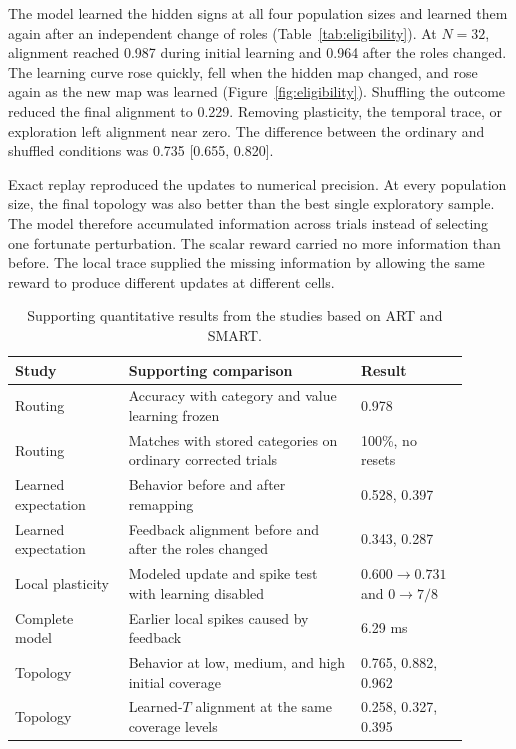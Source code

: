 \documentclass[11pt]{article}
\begin{document}
The model learned the hidden signs at all four population sizes and learned them again after an independent change of roles (Table~\ref{tab:eligibility}). At $N=32$, alignment reached 0.987 during initial learning and 0.964 after the roles changed. The learning curve rose quickly, fell when the hidden map changed, and rose again as the new map was learned (Figure~\ref{fig:eligibility}). Shuffling the outcome reduced the final alignment to 0.229. Removing plasticity, the temporal trace, or exploration left alignment near zero. The difference between the ordinary and shuffled conditions was 0.735 [0.655, 0.820].

Exact replay reproduced the updates to numerical precision. At every population size, the final topology was also better than the best single exploratory sample. The model therefore accumulated information across trials instead of selecting one fortunate perturbation. The scalar reward carried no more information than before. The local trace supplied the missing information by allowing the same reward to produce different updates at different cells.

\begin{table}[tbp]
\centering\small
\begin{tabular}{L{0.23\linewidth}L{0.47\linewidth}L{0.20\linewidth}}
\toprule
Study & Supporting comparison & Result \\
\midrule
Routing & Accuracy with category and value learning frozen & 0.978 \\
Routing & Matches with stored categories on ordinary corrected trials & 100\%, no resets \\
Learned expectation & Behavior before and after remapping & 0.528, 0.397 \\
Learned expectation & Feedback alignment before and after the roles changed & 0.343, 0.287 \\
Local plasticity & Modeled update and spike test with learning disabled & $0.600\rightarrow0.731$ and $0\rightarrow7/8$ \\
Complete model & Earlier local spikes caused by feedback & 6.29 ms \\
Topology & Behavior at low, medium, and high initial coverage & 0.765, 0.882, 0.962 \\
Topology & Learned-$T$ alignment at the same coverage levels & 0.258, 0.327, 0.395 \\
\bottomrule
\end{tabular}
\caption{Supporting quantitative results from the studies based on ART and SMART.}
\label{tab:supporting}
\end{table}
\end{document}
